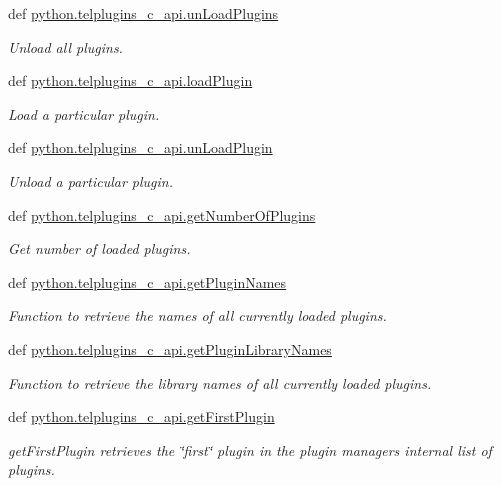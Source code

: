 \begin{DoxyCompactItemize}
def \hyperlink{group__plugin__manager_ga5a1acf994e66cb9c19344e9b2824ad5c}{python.\-telplugins\-\_\-c\-\_\-api.\-un\-Load\-Plugins}
\begin{DoxyCompactList}\small\item\em Unload all plugins. \end{DoxyCompactList}\item 
def \hyperlink{group__plugin__manager_gad2b8003b6e0a18d4bd28a7aafbd14931}{python.\-telplugins\-\_\-c\-\_\-api.\-load\-Plugin}
\begin{DoxyCompactList}\small\item\em Load a particular plugin. \end{DoxyCompactList}\item 
def \hyperlink{group__plugin__manager_ga0e9e177b2d1a1a59b19268e8601f9eb3}{python.\-telplugins\-\_\-c\-\_\-api.\-un\-Load\-Plugin}
\begin{DoxyCompactList}\small\item\em Unload a particular plugin. \end{DoxyCompactList}\item 
def \hyperlink{group__plugin__manager_ga606b9fd03c3289cfdaa0ef899568c777}{python.\-telplugins\-\_\-c\-\_\-api.\-get\-Number\-Of\-Plugins}
\begin{DoxyCompactList}\small\item\em Get number of loaded plugins. \end{DoxyCompactList}\item 
def \hyperlink{group__plugin__manager_ga6cda597795199112440fa43ba870d56c}{python.\-telplugins\-\_\-c\-\_\-api.\-get\-Plugin\-Names}
\begin{DoxyCompactList}\small\item\em Function to retrieve the names of all currently loaded plugins. \end{DoxyCompactList}\item 
def \hyperlink{group__plugin__manager_ga008456902bf3272def69496b56540781}{python.\-telplugins\-\_\-c\-\_\-api.\-get\-Plugin\-Library\-Names}
\begin{DoxyCompactList}\small\item\em Function to retrieve the library names of all currently loaded plugins. \end{DoxyCompactList}\item 
def \hyperlink{group__plugin__manager_ga9f19ce1f85059e9770efb792fae46d68}{python.\-telplugins\-\_\-c\-\_\-api.\-get\-First\-Plugin}
\begin{DoxyCompactList}\small\item\em get\-First\-Plugin retrieves the \char`\"{}first\char`\"{} plugin in the plugin managers internal list of plugins. \end{DoxyCompactList}\item 

\end{DoxyCompactItemize}
